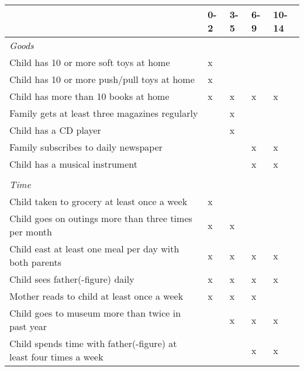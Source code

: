 {
\begin{threeparttable}
	\begin{tabularx}{\textwidth}{|l| *{4}{Y|}}
		\hline 
		 & 0-2 & 3-5 & 6-9 & 10-14 \\
		\hline
		\textit{Goods} & & & & \\
		\hspace{3mm} Child has 10 or more soft toys at home & x & & & \\
		\hspace{3mm} Child has 10 or more push/pull toys at home & x & & & \\
		\hspace{3mm} Child has more than 10 books at home & x & x & x & x \\
		\hspace{3mm} Family gets at least three magazines regularly & & x & & \\
		\hspace{3mm} Child has a  CD player & & x & & \\
		\hspace{3mm} Family subscribes to daily newspaper & & & x & x \\
		\hspace{3mm} Child has a musical instrument & & & x & x \\
		& & & & \\
		\textit{Time} & & & & \\
		\hspace{3mm} Child taken to grocery at least once a week & x & & & \\
		\hspace{3mm} Child goes on outings more than three times per month & x & x & & \\
		\hspace{3mm} Child east at least one meal per day with both parents & x & x & x & x \\
		\hspace{3mm} Child sees father(-figure) daily & x & x & x & x \\
		\hspace{3mm} Mother reads to child at least once a week & x & x & x & \\
		\hspace{3mm} Child goes to museum more than twice in past year & & x & x & x \\
		\hspace{3mm} Child spends time with father(-figure) at least four times a week &  &  & x & x \\

\end{tabularx}
\end{threeparttable}}
